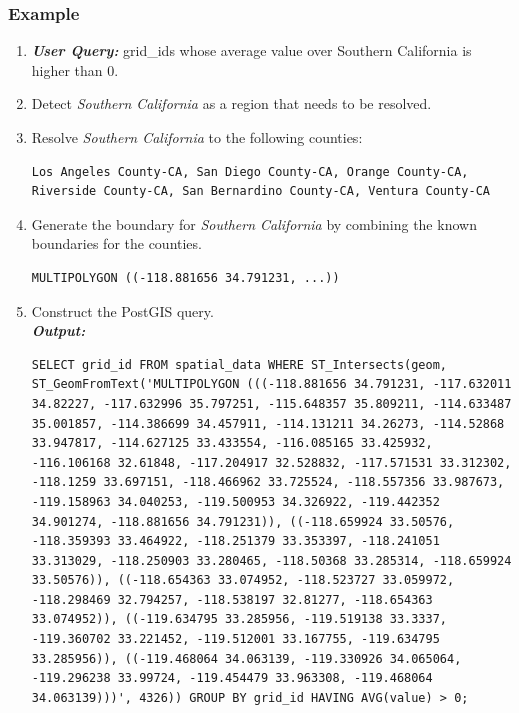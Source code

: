 \subsubsection{Example}
\begin{enumerate}
    \item \textit{\textbf{User Query:}} grid\_ids whose average value over Southern California is higher than 0.
    \item Detect \textit{Southern California} as a region that needs to be resolved.
    \item Resolve \textit{Southern California} to the following counties: \begin{lstlisting}[basicstyle=\ttfamily\footnotesize,breaklines=true, columns=fullflexible,showstringspaces=false, keepspaces=true, belowskip=0pt,breakindent=0pt]
Los Angeles County-CA, San Diego County-CA, Orange County-CA, Riverside County-CA, San Bernardino County-CA, Ventura County-CA \end{lstlisting} 
    \item Generate the boundary for \textit{Southern California} by combining the known boundaries for the counties. \begin{lstlisting}[basicstyle=\ttfamily\footnotesize,breaklines=true, columns=fullflexible,showstringspaces=false, keepspaces=true, belowskip=0pt,breakindent=0pt]
MULTIPOLYGON ((-118.881656 34.791231, ...)) \end{lstlisting} 
    \item Construct the PostGIS query.\\ \textit{\textbf{Output:}}\begin{lstlisting}[basicstyle=\ttfamily\footnotesize,breaklines=true, columns=fullflexible,showstringspaces=false, keepspaces=true, belowskip=0pt]
SELECT grid_id FROM spatial_data WHERE ST_Intersects(geom, ST_GeomFromText('MULTIPOLYGON (((-118.881656 34.791231, -117.632011 34.82227, -117.632996 35.797251, -115.648357 35.809211, -114.633487 35.001857, -114.386699 34.457911, -114.131211 34.26273, -114.52868 33.947817, -114.627125 33.433554, -116.085165 33.425932, -116.106168 32.61848, -117.204917 32.528832, -117.571531 33.312302, -118.1259 33.697151, -118.466962 33.725524, -118.557356 33.987673, -119.158963 34.040253, -119.500953 34.326922, -119.442352 34.901274, -118.881656 34.791231)), ((-118.659924 33.50576, -118.359393 33.464922, -118.251379 33.353397, -118.241051 33.313029, -118.250903 33.280465, -118.50368 33.285314, -118.659924 33.50576)), ((-118.654363 33.074952, -118.523727 33.059972, -118.298469 32.794257, -118.538197 32.81277, -118.654363 33.074952)), ((-119.634795 33.285956, -119.519138 33.3337, -119.360702 33.221452, -119.512001 33.167755, -119.634795 33.285956)), ((-119.468064 34.063139, -119.330926 34.065064, -119.296238 33.99724, -119.454479 33.963308, -119.468064 34.063139)))', 4326)) GROUP BY grid_id HAVING AVG(value) > 0; \end{lstlisting}

\end{enumerate}
